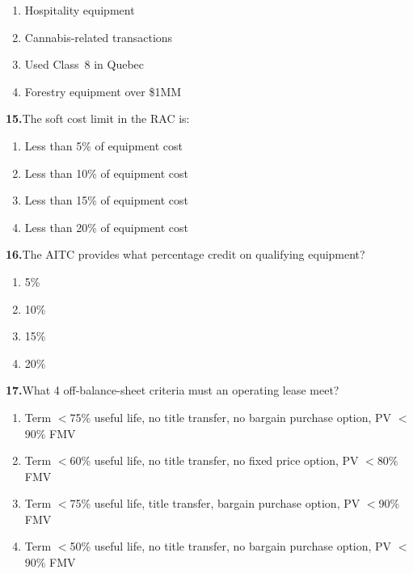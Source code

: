 \documentclass[11pt,letterpaper]{article}
\newif\ifshowsolutions
\newcommand{\answer}[1]{%
  \ifshowsolutions
    \begin{tcolorbox}[colback=green!5!white, colframe=answergreen, title={\small\textbf{Answer}}, fonttitle=\color{white}, coltitle=white, colbacktitle=answergreen, boxrule=0.5pt, arc=2pt, left=4pt, right=4pt, top=2pt, bottom=2pt]
    {\small #1}
    \end{tcolorbox}
  \fi
}
\begin{document}
\begin{enumerate}[label=\Alph*), leftmargin=2em, itemsep=0pt]
\item Hospitality equipment
\item Cannabis-related transactions
\item Used Class~8 in Quebec
\item Forestry equipment over \$1MM
\end{enumerate}
\answer{B) Cannabis is absolutely prohibited, along with crypto, weapons, gambling, O\&G $>$\$1MM USD, and personal use.}

\vspace{0.5em}

\noindent\textbf{15.}\quad The soft cost limit in the RAC is:

\begin{enumerate}[label=\Alph*), leftmargin=2em, itemsep=0pt]
\item Less than 5\% of equipment cost
\item Less than 10\% of equipment cost
\item Less than 15\% of equipment cost
\item Less than 20\% of equipment cost
\end{enumerate}
\answer{B) Less than 10\%. GPS, warranties, delivery, and installation all count as soft costs.}

\vspace{0.5em}

\noindent\textbf{16.}\quad The AITC provides what percentage credit on qualifying equipment?

\begin{enumerate}[label=\Alph*), leftmargin=2em, itemsep=0pt]
\item 5\%
\item 10\%
\item 15\%
\item 20\%
\end{enumerate}
\answer{B) 10\%. Atlantic Investment Tax Credit: 10\%, min 24-month lease, 5 eligible regions, 7 qualifying industries.}

\vspace{0.5em}

\noindent\textbf{17.}\quad What 4 off-balance-sheet criteria must an operating lease meet?

\begin{enumerate}[label=\Alph*), leftmargin=2em, itemsep=0pt]
\item Term $<$75\% useful life, no title transfer, no bargain purchase option, PV $<$90\% FMV
\item Term $<$60\% useful life, no title transfer, no fixed price option, PV $<$80\% FMV
\item Term $<$75\% useful life, title transfer, bargain purchase option, PV $<$90\% FMV
\item Term $<$50\% useful life, no title transfer, no bargain purchase option, PV $<$90\% FMV
\end{enumerate}
\answer{A) All 4 must be true: (1) Term $<$75\% useful life, (2) No title transfer, (3) No bargain purchase option, (4) PV of payments $<$90\% of FMV.}
\end{document}
